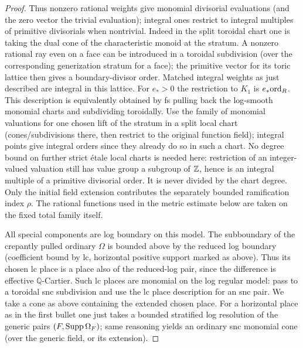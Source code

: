 \begin{proof}
Thus nonzero rational weights give monomial divisorial evaluations (and the zero vector the trivial evaluation); integral ones restrict to integral multiples of primitive divisorials when nontrivial.
Indeed in the split toroidal chart one is taking the dual cone of the characteristic monoid at the stratum.
A nonzero rational ray even on a face can be introduced in a toroidal subdivision (over the corresponding generization stratum for a face); the primitive vector for its toric lattice then gives a boundary-divisor order.
Matched integral weights as just described are integral in this lattice.
For \(e_*>0\) the restriction to \(K_1\) is \(e_*{\rm ord}_{R}\).
This description is equivalently obtained by fs pulling back the log-smooth monomial charts and subdividing toroidally.
Use the family of monomial valuations for one chosen lift of the stratum in a split local chart (cones/subdivisions there, then restrict to the original function field); integral points give integral orders since they already do so in such a chart.
No degree bound on further strict \'etale local charts is needed here:
restriction of an integer-valued valuation still has value group a
subgroup of \(\mathbb Z\), hence is an integral multiple of a primitive
divisorial order.  It is never divided by the chart degree.
Only the initial field extension contributes the separately bounded
ramification index \(\rho\).  The rational functions used in the metric
estimate below are taken on the fixed total family itself.

All special components are log boundary on this model.
The subboundary of the crepantly pulled ordinary \(\Omega\) is bounded above by the reduced log boundary (coefficient bound by lc, horizontal positive support marked as above).
Thus its chosen lc place is a place also of the reduced-log pair, since the difference is effective \(\mathbb Q\)-Cartier.
Such lc places are monomial on the log regular model: pass to a toroidal snc subdivision and use the lc place description for an snc pair.
We take a cone as above containing the extended chosen place.
For a horizontal place as in the first bullet one just takes a bounded stratified log resolution of the generic pairs \((F,{\rm Supp}\,\Omega_F)\); same reasoning yields an ordinary snc monomial cone (over the generic field, or its extension).


\end{proof}
